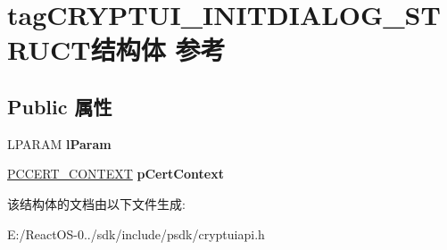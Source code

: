 \hypertarget{structtag_c_r_y_p_t_u_i___i_n_i_t_d_i_a_l_o_g___s_t_r_u_c_t}{}\section{tag\+C\+R\+Y\+P\+T\+U\+I\+\_\+\+I\+N\+I\+T\+D\+I\+A\+L\+O\+G\+\_\+\+S\+T\+R\+U\+C\+T结构体 参考}
\label{structtag_c_r_y_p_t_u_i___i_n_i_t_d_i_a_l_o_g___s_t_r_u_c_t}
\subsection*{Public 属性}
\begin{DoxyCompactItemize}
\item 
\mbox{\label{structtag_c_r_y_p_t_u_i___i_n_i_t_d_i_a_l_o_g___s_t_r_u_c_t_adf87c5aaf1bebc087dc1b1f53a47a70c}} 
L\+P\+A\+R\+AM {\bfseries l\+Param}
\item 
\mbox{\label{structtag_c_r_y_p_t_u_i___i_n_i_t_d_i_a_l_o_g___s_t_r_u_c_t_aa91008ff343a2871332aa63eef99dfee}} 
\hyperlink{struct___c_e_r_t___c_o_n_t_e_x_t}{P\+C\+C\+E\+R\+T\+\_\+\+C\+O\+N\+T\+E\+XT} {\bfseries p\+Cert\+Context}
\end{DoxyCompactItemize}


该结构体的文档由以下文件生成\+:\begin{DoxyCompactItemize}
\item 
E\+:/\+React\+O\+S-\/0../sdk/include/psdk/cryptuiapi.\+h\end{DoxyCompactItemize}
